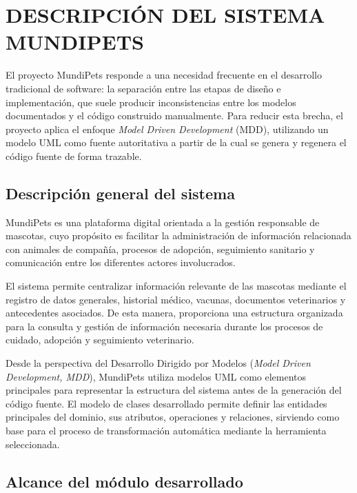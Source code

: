\documentclass[10pt,a4paper,openany]{report}
\begin{document}
	
	
	
	
	
	\chapter{DESCRIPCIÓN DEL SISTEMA MUNDIPETS}
	
	El proyecto MundiPets responde a una necesidad frecuente en el desarrollo
	tradicional de software: la separación entre las etapas de diseño e
	implementación, que suele producir inconsistencias entre los modelos
	documentados y el código construido manualmente. Para reducir esta brecha,
	el proyecto aplica el enfoque \textit{Model Driven Development} (MDD),
	utilizando un modelo UML como fuente autoritativa a partir de la cual se
	genera y regenera el código fuente de forma trazable.
	
	\section{Descripción general del sistema}
	
	MundiPets es una plataforma digital orientada a la gestión responsable de mascotas,
	cuyo propósito es facilitar la administración de información relacionada con animales
	de compañía, procesos de adopción, seguimiento sanitario y comunicación entre los
	diferentes actores involucrados.
	
	El sistema permite centralizar información relevante de las mascotas mediante el
	registro de datos generales, historial médico, vacunas, documentos veterinarios y
	antecedentes asociados. De esta manera, proporciona una estructura organizada para
	la consulta y gestión de información necesaria durante los procesos de cuidado,
	adopción y seguimiento veterinario.
	
	Desde la perspectiva del Desarrollo Dirigido por Modelos
	(\textit{Model Driven Development, MDD}), MundiPets utiliza modelos UML como
	elementos principales para representar la estructura del sistema antes de la
	generación del código fuente. El modelo de clases desarrollado permite definir las
	entidades principales del dominio, sus atributos, operaciones y relaciones, sirviendo
	como base para el proceso de transformación automática mediante la herramienta
	seleccionada.
	
	
	\section{Alcance del módulo desarrollado}
	
\end{document}
